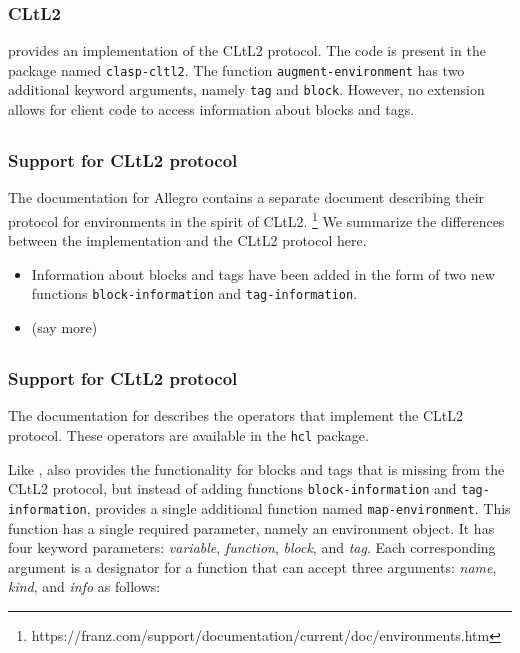 \subsubsection{CLtL2}

\clasp{} provides an implementation of the CLtL2 protocol.
The code is present in the package named \texttt{clasp-cltl2}.  The
function \texttt{augment-environment} has two additional keyword
arguments, namely \texttt{tag} and \texttt{block}.  However, no
extension allows for client code to access information about blocks
and tags.

\subsection{\allegro{}}
\label{sec-previous-allegro}

\subsubsection{Support for CLtL2 protocol}

The documentation for Allegro \commonlisp{} contains a separate
document describing their protocol for environments in the spirit of
CLtL2.%
\footnote{https://franz.com/support/documentation/current/doc/environments.htm}
We summarize the differences between the \allegro{} implementation and
the CLtL2 protocol here.

\begin{itemize}
\item Information about blocks and tags have been added in the form of
  two new functions \texttt{block-information} and
  \texttt{tag-information}.
\item (say more)
\end{itemize}

\subsection{\lispworks{}}
\label{sec-previous-lispworks}

\subsubsection{Support for CLtL2 protocol}

The documentation for \lispworks{} \commonlisp{} describes the
operators that implement the CLtL2 protocol.  These operators are
available in the \texttt{hcl} package.

Like \allegro{}, \lispworks{} also provides the functionality for
blocks and tags that is missing from the CLtL2 protocol, but instead
of adding functions \texttt{block-information} and
\texttt{tag-information}, \lispworks{} provides a single additional
function named \texttt{map-environment}.  This function has a single
required parameter, namely an environment object.  It has four
keyword parameters: \textit{variable}, \textit{function},
\textit{block}, and \textit{tag}.  Each corresponding argument is a
designator for a function that can accept three arguments:
\textit{name}, \textit{kind}, and \textit{info} as follows:

